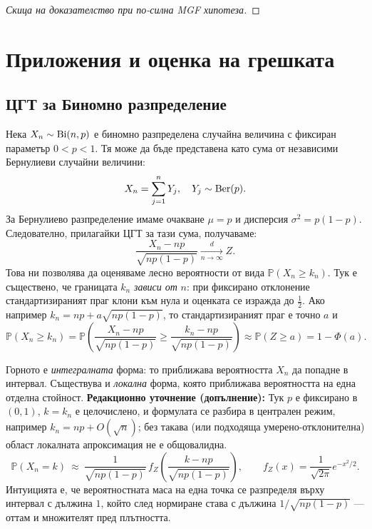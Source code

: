 \begin{proof}[Скица на доказателство при по-силна MGF хипотеза]
\end{proof}

\section{Приложения и оценка на грешката}

\subsection{ЦГТ за Биномно разпределение}
Нека $X_n \sim \operatorname{Bi}(n, p)$ е биномно разпределена случайна величина с фиксиран параметър
$0<p<1$. Тя може да бъде представена като сума от независими Бернулиеви случайни величини:
\[ X_n = \sum_{j=1}^n Y_j, \quad Y_j \sim \operatorname{Ber}(p). \]
За Бернулиево разпределение имаме очакване $\mu = p$ и дисперсия $\sigma^2 = p(1-p)$. Следователно, прилагайки ЦГТ за тази сума, получаваме:
\[ \frac{X_n - np}{\sqrt{np(1-p)}} \xrightarrow[n \to \infty]{d} Z. \]
Това ни позволява да оценяваме лесно вероятности от вида $\mathbb{P}(X_n \ge k_n)$. Тук е
съществено, че границата $k_n$ \emph{зависи от} $n$: при фиксирано отклонение стандартизираният
праг клони към нула и оценката се изражда до $\frac12$. Ако например
$k_n = np + a\sqrt{np(1-p)}$, то стандартизираният праг е точно $a$ и
\[ \mathbb{P}(X_n \ge k_n) = \mathbb{P}\left( \frac{X_n - np}{\sqrt{np(1-p)}} \ge \frac{k_n - np}{\sqrt{np(1-p)}} \right) \approx \mathbb{P}(Z \ge a) = 1 - \Phi(a). \]

\begin{supp}\label{supp:moivre-local}
Горното е \emph{интегралната} форма: то приближава вероятността $X_n$ да попадне в
интервал. Съществува и \emph{локална} форма, която приближава вероятността на една
отделна стойност. \textbf{Редакционно уточнение (допълнение):} Тук $p$ е фиксирано
в $ (0,1)$, $k=k_n$ е целочислено, и формулата се разбира в централен режим,
например $k_n=np+O(\sqrt n)$; без такава (или подходяща умерено-отклонителна)
област локалната апроксимация не е общовалидна.
\[
\mathbb{P}(X_n = k) \ \approx\ \frac{1}{\sqrt{np(1-p)}}\, f_Z\!\left( \frac{k-np}{\sqrt{np(1-p)}} \right),
\qquad f_Z(x) = \frac{1}{\sqrt{2\pi}}e^{-x^2/2}.
\]
Интуицията е, че вероятностната маса на една точка се разпределя върху интервал с дължина
$1$, който след нормиране става с дължина $1/\sqrt{np(1-p)}$ — оттам и множителят пред
плътността.
\end{supp}

